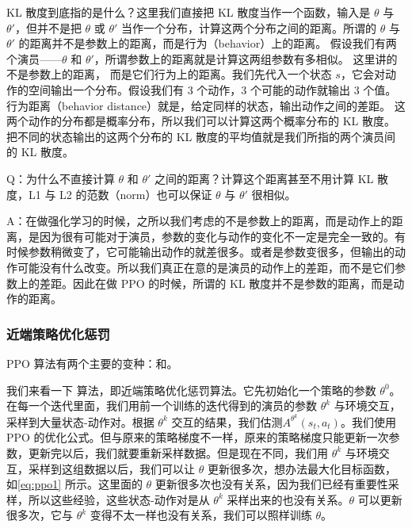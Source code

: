 

KL 散度到底指的是什么？这里我们直接把 KL 散度当作一个函数，输入是 $\theta$ 与 $\theta'$，但并不是把 $\theta$ 或 $\theta'$  当作一个分布，计算这两个分布之间的距离。所谓的 $\theta$ 与 $\theta'$  的距离并不是参数上的距离，而是行为（behavior）上的距离。
假设我们有两个演员------$\theta$ 和 $\theta'$，所谓参数上的距离就是计算这两组参数有多相似。
这里讲的不是参数上的距离， 而是它们行为上的距离。我们先代入一个状态 $s$，它会对动作的空间输出一个分布。假设我们有 3 个动作，3 个可能的动作就输出 3 个值。行为距离（behavior distance）就是，给定同样的状态，输出动作之间的差距。
这两个动作的分布都是概率分布，所以我们可以计算这两个概率分布的 KL 散度。把不同的状态输出的这两个分布的 KL 散度的平均值就是我们所指的两个演员间的 KL 散度。

Q：为什么不直接计算 $\theta$ 和 $\theta'$ 之间的距离？计算这个距离甚至不用计算 KL 散度，L1 与 L2 的范数（norm）也可以保证 $\theta$ 与 $\theta'$ 很相似。

A：在做强化学习的时候，之所以我们考虑的不是参数上的距离，而是动作上的距离，是因为很有可能对于演员，参数的变化与动作的变化不一定是完全一致的。有时候参数稍微变了，它可能输出动作的就差很多。或者是参数变很多，但输出的动作可能没有什么改变。所以我们真正在意的是演员的动作上的差距，而不是它们参数上的差距。因此在做 PPO 的时候，所谓的 KL 散度并不是参数的距离，而是动作的距离。

\subsubsection{近端策略优化惩罚} 


PPO 算法有两个主要的变种：和。

我们来看一下  算法，即近端策略优化惩罚算法。它先初始化一个策略的参数 $\theta^0$。在每一个迭代里面，我们用前一个训练的迭代得到的演员的参数 $\theta^k$ 与环境交互，采样到大量状态-动作对。根据 $\theta^k$ 交互的结果，我们估测$A^{\theta^{k}}\left(s_{t}, a_{t}\right)$。我们使用 PPO 的优化公式。但与原来的策略梯度不一样，原来的策略梯度只能更新一次参数，更新完以后，我们就要重新采样数据。但是现在不同，我们用 $\theta^k$ 与环境交互，采样到这组数据以后，我们可以让 $\theta$ 更新很多次，想办法最大化目标函数，如\eqref{eq:ppo1} 所示。这里面的 $\theta$ 更新很多次也没有关系，因为我们已经有重要性采样，所以这些经验，这些状态-动作对是从 $\theta^k$ 采样出来的也没有关系。$\theta$ 可以更新很多次，它与 $\theta^k$ 变得不太一样也没有关系，我们可以照样训练 $\theta$。

